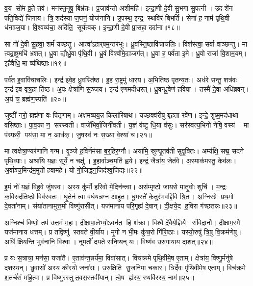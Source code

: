 व॒य सो॑म व्र॒ते तव॑।
मन॑स्त॒नूषु॒ बिभ्र॑तः।
प्र॒जाव॑न्तो अशीमहि।
इ॒न्द्रा॒णी दे॒वी सु॒भगा॑ सु॒पत्नी।
उदशे॑न पति॒विद्ये॑ जिगाय।
त्रि॒शद॑स्या ज॒घनं॒ योज॑नानि।
उ॒पस्थ॒ इन्द्र॒ स्थवि॑रं बिभर्ति।
सेना॑ ह॒ नाम॑ पृथि॒वी ध॑नञ्ज॒या।
वि॒श्वव्य॑चा॒ अदि॑ति॒ सूर्य॑त्वक्।
इ॒न्द्रा॒णी दे॒वी प्रा॒सहा॒ ददा॑ना॥१८॥

सा नो॑ दे॒वी सु॒हवा॒ शर्म॑ यच्छतु।
आत्वा॑ऽहार्‌षम॒न्तर॑भूः।
ध्रु॒वस्ति॒ष्ठावि॑चाचलिः।
विश॑स्त्वा॒ सर्वा॑ वाञ्छन्तु।
मा त्वद्रा॒ष्ट्रमधि॑ भ्रशत्।
ध्रु॒वा द्यौर्ध्रु॒वा पृ॑थि॒वी।
ध्रु॒वं विश्व॑मि॒दञ्जग॑त्।
ध्रु॒वा ह॒ पर्व॑ता इ॒मे।
ध्रु॒वो राजा॑ वि॒शाम॒यम्।
इ॒हैवैधि॒ मा व्य॑थिष्ठाः॥१९॥

पर्व॑त इ॒वावि॑चाचलिः।
इन्द्र॑ इवे॒ह ध्रु॒वस्ति॑ष्ठ।
इ॒ह रा॒ष्ट्रमु॑ धारय।
अ॒भिति॑ष्ठ पृतन्य॒तः।
अध॑रे सन्तु॒ शत्र॑वः।
इन्द्र॑ इव वृत्र॒हा ति॑ष्ठ।
अ॒पः क्षेत्रा॑णि स॒ञ्जय\sn{}।
इन्द्र॑ एणमदीधरत्।
ध्रु॒वन्ध्रु॒वेण॑ ह॒विषा।
तस्मै॑ दे॒वा अधि॑ब्रवन्।
अ॒यं च॒ ब्रह्म॑ण॒स्पति॑॥२०॥\anuvakamend[ह॒विर्भि॑रा॒स्य॑मभि॒ दास॑तो विप॒श्चित॒मप्र॑यावञ्जी॒वसे॒ ददा॑ना व्यथिष्ठा ब्रव॒न्नेकं च]

जुष्टी॑ नरो॒ ब्रह्म॑णा वः पितृ॒णाम्।
अक्ष॑मव्यय॒न्न किला॑रिषाथ।
यच्छक्व॑रीषु बृह॒ता रवे॑ण।
इन्द्रे॒ शुष्म॒मद॑धाथा वसिष्ठाः।
पा॒व॒का न॒ सर॑स्वती।
वाजे॑भिर्वा॒जिनी॑वती।
य॒ज्ञं व॑ष्टु धि॒या व॑सुः।
सर॑स्वत्य॒भिनो॑ नेषि॒ वस्य॑।
मा प॑स्फरी॒ पय॑सा॒ मा न॒ आध॑क्।
जु॒षस्व॑ नः स॒ख्या॑ वे॒श्या॑ च॥२१॥

मा त्वक्षेत्रा॒ण्यर॑णानि गन्म।
वृ॒ञ्जे ह॒विर्नम॑सा ब॒र्॒हिर॒ग्नौ।
अया॑मि॒ स्रुग्घृ॒तव॑ती सुवृ॒क्तिः।
अम्य॑क्षि॒ सद्म॒ सद॑ने पृथि॒व्याः।
अश्रा॑यि य॒ज्ञः सूर्ये॒ न चक्षु॑।
इ॒हार्वाञ्च॒मति॑ ह्वये।
इन्द्रं॒ जैत्रा॑य॒ जेत॑वे।
अ॒स्माक॑मस्तु॒ केव॑लः।
अ॒र्वाञ्च॒मिन्द्र॑म॒मुतो॑ हवामहे।
यो गो॒जिद्ध॑न॒जिद॑श्व॒जिद्यः॥२२॥

इ॒मं नो॑ य॒ज्ञं वि॑ह॒वे जु॑षस्व।
अ॒स्य कु॑र्मो हरिवो मे॒दिन॑न्त्वा।
अस॑म्मृष्टो जायसे मातृ॒वोः शुचि॑।
म॒न्द्रः क॒विरुद॑तिष्ठो॒ विव॑स्वतः।
घृ॒तेन॑ त्वा वर्धयन्नग्न आहुत।
धू॒मस्ते॑ के॒तुर॑भवद्दि॒वि श्रि॒तः।
अ॒ग्निरग्रे प्रथ॒मो दे॒वता॑नाम्।
संया॑तानामुत्त॒मो विष्णु॑रासीत्।
यज॑मानाय परि॒गृह्य॑ दे॒वान्।
दी॒क्षये॒द ह॒विरा ग॑च्छतन्नः॥२३॥

अ॒ग्निश्च॑ विष्णो॒ तप॑ उत्त॒मं म॒हः।
दी॒क्षा॒पा॒लेभ्यो॒ऽवन॑त॒ हि श॑क्रा।
विश्वैर्दे॒वैर्य॒ज्ञियै संविदा॒नौ।
दी॒क्षाम॒स्मै यज॑मानाय धत्तम्।
प्र तद्विष्णु॑ स्तवते वी॒र्या॑य।
मृ॒गो न भी॒मः कु॑च॒रो गि॑रि॒ष्ठाः।
यस्यो॒रुषु॑ त्रि॒षु वि॒क्रम॑णेषु।
अधि॑ क्षि॒यन्ति॒ भुव॑नानि॒ विश्वा।
नूमर्तो॑ दयते सनि॒ष्यन् यः।
विष्ण॑व उरुगा॒याय॒ दाश॑त्॥२४॥

प्र यः स॒त्राचा॒ मन॑सा॒ यजा॑तै।
ए॒ताव॑न्त॒न्नर्य॑मा॒ विवा॑सात्।
विच॑क्रमे पृथि॒वीमे॒ष ए॒ताम्।
क्षेत्रा॑य॒ विष्णु॒र्मनु॑षे दश॒स्यन्।
ध्रु॒वासो॑ अस्य की॒रयो॒ जना॑सः।
उ॒रु॒क्षि॒ति सु॒जनि॑मा चकार।
त्रिर्दे॒वः पृ॑थि॒वीमे॒ष ए॒ताम्।
विच॑क्रमे श॒तर्च॑सं महि॒त्वा।
प्र विष्णु॑रस्तु त॒वस॒स्तवी॑यान्।
त्वे॒ष ह्य॑स्य॒ स्थवि॑रस्य॒ नाम॑॥२५॥

